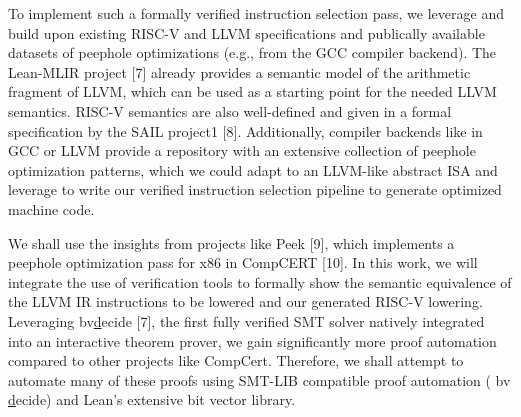 To implement such a formally verified instruction selection pass, we leverage and build upon existing RISC-V and LLVM specifications and publically available datasets of peephole optimizations (e.g., from the GCC compiler backend). The Lean-MLIR project [7] already provides a semantic model of the arithmetic fragment of LLVM, which can be used as a starting point for the needed LLVM semantics. RISC-V semantics are also well-defined and given in a formal specification by the SAIL project1 [8]. Additionally, compiler backends like in GCC or LLVM provide a repository with an extensive collection of peephole optimization patterns, which we could adapt to an LLVM-like abstract ISA and leverage to write our verified instruction selection pipeline to generate optimized machine code.

We shall use the insights from projects like Peek [9], which implements a peephole optimization pass for x86 in CompCERT [10]. In this work, we will integrate the use of verification tools to formally show the semantic equivalence of the LLVM IR instructions to be lowered and our generated RISC-V lowering. Leveraging bv\underline decide [7], the first fully verified SMT solver natively integrated into an interactive theorem prover, we gain significantly more proof automation compared to other projects like CompCert. Therefore, we shall attempt to automate many of these proofs using SMT-LIB compatible proof automation ( bv \underline decide) and Lean’s extensive bit vector library.
